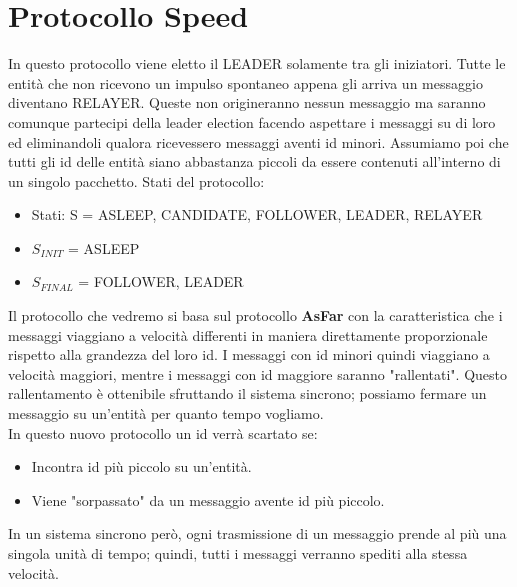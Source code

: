 \section{Protocollo Speed}
In questo protocollo viene eletto il LEADER solamente tra gli iniziatori. Tutte
le entità che non ricevono un impulso spontaneo appena gli arriva un messaggio
diventano RELAYER. Queste non origineranno nessun messaggio ma saranno comunque
partecipi della leader election facendo aspettare i messaggi su di loro ed
eliminandoli qualora ricevessero messaggi aventi id minori. Assumiamo poi che
tutti gli id delle entità siano abbastanza piccoli da essere contenuti
all'interno di un singolo pacchetto. Stati del protocollo:
\begin{itemize}
    \item Stati: S = ASLEEP, CANDIDATE, FOLLOWER, LEADER, RELAYER
    \item        $S_{INIT}$ = ASLEEP
    \item        $S_{FINAL}$ = FOLLOWER, LEADER
\end{itemize}
Il protocollo che vedremo si basa sul protocollo \textbf{AsFar} con la
caratteristica che i messaggi viaggiano a velocità differenti in maniera
direttamente proporzionale rispetto alla grandezza del loro id. I messaggi con
id minori quindi viaggiano a velocità maggiori, mentre i messaggi con id
maggiore saranno "rallentati". Questo rallentamento è ottenibile sfruttando il
sistema sincrono; possiamo fermare un messaggio su un'entità per quanto tempo
vogliamo.\\
In questo nuovo protocollo un id verrà scartato se:
\begin{itemize}
    \item Incontra id più piccolo su un'entità.
    \item Viene "sorpassato" da un messaggio avente id più piccolo.
\end{itemize}
In un sistema sincrono però, ogni trasmissione di un messaggio prende al più una
singola unità di tempo; quindi, tutti i messaggi verranno spediti alla stessa
velocità.\\

